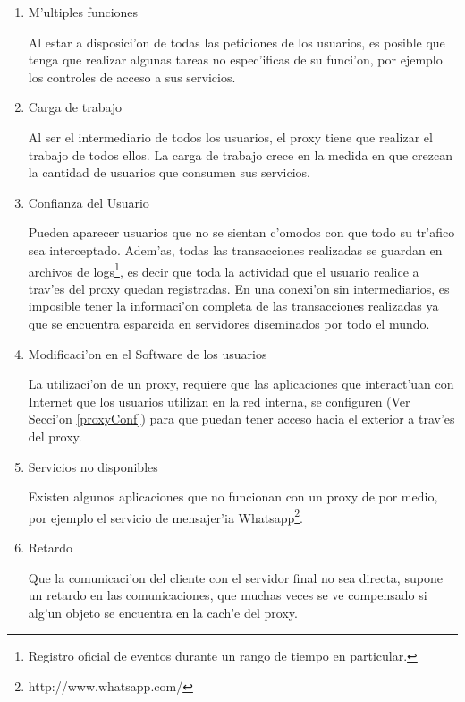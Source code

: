 \begin{enumerate}
\item M'ultiples funciones

Al estar a disposici'on de todas las peticiones de los usuarios, es posible que tenga que realizar algunas tareas no espec'ificas de su funci'on, por ejemplo los controles de acceso a sus servicios.
\item Carga de trabajo

Al ser el intermediario de todos los usuarios, el proxy tiene que realizar el trabajo de todos ellos. La carga de trabajo crece en la medida en que crezcan la cantidad de usuarios que consumen sus servicios.
\item Confianza del Usuario

Pueden aparecer usuarios que no se sientan c'omodos con que todo su tr'afico sea interceptado. Adem'as, todas las transacciones realizadas se guardan en archivos de logs\footnote{Registro oficial de eventos durante un rango de tiempo en particular.}, es decir que toda la actividad que el usuario realice a trav'es del proxy quedan registradas. En una conexi'on sin intermediarios, es imposible tener la informaci'on completa de las transacciones realizadas ya que se encuentra esparcida en servidores diseminados por todo el mundo.
\item Modificaci'on en el Software de los usuarios

La utilizaci'on de un proxy, requiere que las aplicaciones que interact'uan con Internet que los usuarios utilizan en la red interna, se configuren (Ver Secci'on \ref{proxyConf}) para que puedan tener acceso hacia el exterior a trav'es del proxy. 
\item Servicios no disponibles

Existen algunos aplicaciones que no funcionan con un proxy de por medio, por ejemplo el servicio de mensajer'ia Whatsapp\footnote{http://www.whatsapp.com/}.
\item Retardo

Que la comunicaci'on del cliente con el servidor final no sea directa, supone un retardo en las comunicaciones, que muchas veces se ve compensado si alg'un objeto se encuentra en la cach'e del proxy.
\end{enumerate}


